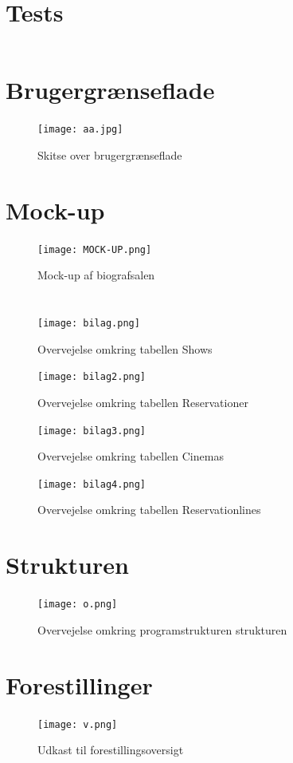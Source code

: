 \documentclass[final]{report}
\begin{document}
\begin{appendix}

\chapter{Tests}
\inputminted{java}{../src/test/DBConnectTest.java}

\chapter{Brugergrænseflade}
\begin{figure}[h]
\centering
\texttt{[image: aa.jpg]}
\caption{Skitse over brugergrænseflade}
\end{figure}

\chapter{Mock-up}
\begin{figure}[h]
\centering
\texttt{[image: MOCK-UP.png]}
\caption{Mock-up af biografsalen}
\end{figure}

\chapter{}

\begin{figure}[h]
\centering
\texttt{[image: bilag.png]}
\caption{Overvejelse omkring tabellen Shows}
\end{figure}

\begin{figure}[h]
\centering
\texttt{[image: bilag2.png]}
\caption{Overvejelse omkring tabellen Reservationer}
\end{figure}

\begin{figure}[h]
\centering
\texttt{[image: bilag3.png]}
\caption{Overvejelse omkring tabellen Cinemas}
\end{figure}

\begin{figure}[h]
\centering
\texttt{[image: bilag4.png]}
\caption{Overvejelse omkring tabellen Reservationlines}
\end{figure}

\chapter{Strukturen}

\begin{figure}[h]
\centering
\texttt{[image: o.png]}
\caption{Overvejelse omkring programstrukturen strukturen}
\end{figure}

\chapter{Forestillinger}
\begin{figure}[h]
\centering
\texttt{[image: v.png]}
\caption{Udkast til forestillingsoversigt}
\end{figure}

\end{appendix}
\end{document}
